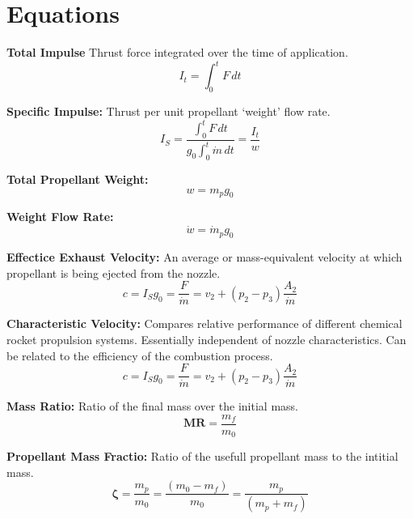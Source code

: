 \documentclass[12pt]{article}
\begin{document}
\section*{Equations}

\textbf{Total Impulse}
Thrust force integrated over the time of application.
\begin{equation}
    I_t = \int_{0}^{t}F\,dt 
\end{equation}

\bigskip
\noindent
\textbf{Specific Impulse:}
Thrust per unit propellant `weight' flow rate. 
\begin{equation}
    I_S = \frac{\int_{0}^{t}F\,dt }{g_0\int_{0}^{t}\dot{m}\,dt} = \frac{I_t}{w} 
\end{equation}

\bigskip
\noindent
\textbf{Total Propellant Weight:}
\begin{equation}
    w = m_p g_0
\end{equation}

\bigskip
\noindent
\textbf{Weight Flow Rate:}
\begin{equation}
    \dot{w} = \dot{m}_p g_0
\end{equation}

\bigskip
\noindent
\textbf{Effectice Exhaust Velocity:}
An average or mass-equivalent velocity at which propellant is being ejected from the nozzle.
\begin{equation}
    c = I_S g_0 = \frac{F}{\dot{m}} = v_2 + (p_2 - p_3) \frac{A_2}{\dot{m}}
\end{equation}

\bigskip
\noindent
\textbf{Characteristic Velocity:}
Compares relative performance of different chemical rocket propulsion systems. Essentially independent of nozzle characteristics. Can be related to the efficiency of the combustion process.
\begin{equation}
    c = I_S g_0 = \frac{F}{\dot{m}} = v_2 + (p_2 - p_3) \frac{A_2}{\dot{m}}
\end{equation}

\bigskip
\noindent
\textbf{Mass Ratio:}
Ratio of the final mass over the initial mass. 
\begin{equation}
    \mathbf{M}\mathbf{R} = \frac{m_f}{m_0}
\end{equation}

\bigskip
\noindent
\textbf{Propellant Mass Fractio:}
Ratio of the usefull propellant mass to the intitial mass.
\begin{equation}
    \mathbf{\zeta} = \frac{m_p}{m_0} = \frac{(m_0 - m_f)}{m_0} = \frac{m_p}{(m_p + m_f)}
\end{equation}
\end{document}
